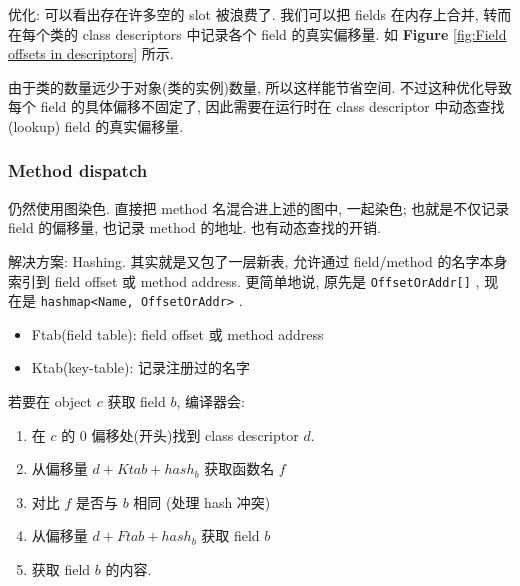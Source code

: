 

优化: 可以看出存在许多空的 slot 被浪费了. 我们可以把 fields 在内存上合并, 转而在每个类的 class descriptors 中记录各个 field 的真实偏移量. 如 \textbf{Figure} \ref{fig:Field offsets in descriptors} 所示. 



由于类的数量远少于对象(类的实例)数量, 所以这样能节省空间. 不过这种优化导致每个 field 的具体偏移不固定了, 因此需要在运行时在 class descriptor 中动态查找(lookup) field 的真实偏移量.

\subsubsection{Method dispatch}
仍然使用图染色. 直接把 method 名混合进上述的图中, 一起染色; 也就是不仅记录 field 的偏移量, 也记录 method 的地址. 也有动态查找的开销. 

解决方案: Hashing. 其实就是又包了一层新表, 允许通过 field/method 的名字本身索引到 field offset 或 method address. 更简单地说, 原先是 \texttt{OffsetOrAddr[]} , 现在是 \texttt{hashmap<Name, OffsetOrAddr>} .

\begin{itemize}
    \item Ftab(field table): field offset 或 method address
    \item Ktab(key-table): 记录注册过的名字
\end{itemize}

若要在 object $c$ 获取 field $b$, 编译器会:
\begin{enumerate}
    \item 在 $c$ 的 0 偏移处(开头)找到 class descriptor $d$.
    \item 从偏移量 $d+Ktab+hash_b$ 获取函数名 $f$
    \item 对比 $f$ 是否与 $b$ 相同 (处理 hash 冲突)
    \item 从偏移量 $d+Ftab+hash_b$ 获取 field $b$
    \item 获取 field $b$ 的内容. 
\end{enumerate}

